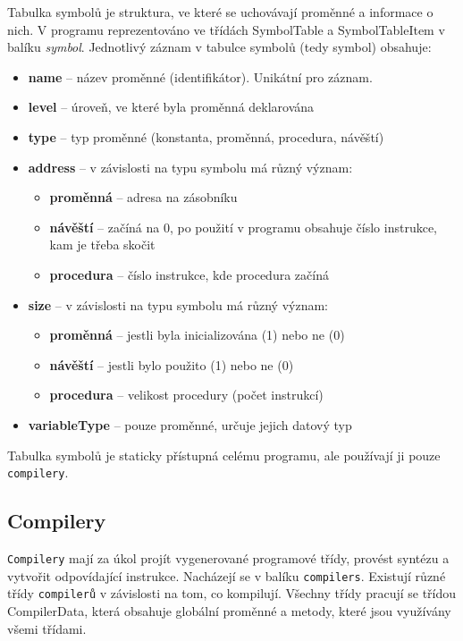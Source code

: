 \documentclass[
12pt,
a4paper,
pdftex,
czech,
titlepage
]{report}
\begin{document}
  Tabulka symbolů je struktura, ve které se uchovávají proměnné a informace o nich. V programu reprezentováno ve třídách SymbolTable a SymbolTableItem v balíku \textit{symbol}. Jednotlivý záznam v tabulce symbolů (tedy symbol) obsahuje:
\begin{itemize}
\item \textbf{name} -- název proměnné (identifikátor). Unikátní pro záznam.
\item \textbf{level} -- úroveň, ve které byla proměnná deklarována
\item \textbf{type} -- typ proměnné (konstanta, proměnná, procedura, návěští)
\item \textbf{address} -- v závislosti na typu symbolu má různý význam:
\begin{itemize}
\item \textbf{proměnná} -- adresa na zásobníku
\item \textbf{návěští} -- začíná na 0, po použití v programu obsahuje číslo instrukce, kam je třeba skočit
\item \textbf{procedura} -- číslo instrukce, kde procedura začíná
\end{itemize}
\item \textbf{size} -- v závislosti na typu symbolu má různý význam:
\begin{itemize}
\item \textbf{proměnná} -- jestli byla inicializována (1) nebo ne (0)
\item \textbf{návěští} -- jestli bylo použito (1) nebo ne (0)
\item \textbf{procedura} -- velikost procedury (počet instrukcí)
\end{itemize} 
\item \textbf{variableType} -- pouze proměnné, určuje jejich datový typ  
\end{itemize} 
  
Tabulka symbolů je staticky přístupná celému programu, ale používají ji pouze \texttt{compilery}.
  
\subsection{Compilery}
 
\texttt{Compilery} mají za úkol projít vygenerované programové třídy, provést syntézu a vytvořit odpovídající instrukce. Nacházejí se v balíku \texttt{compilers}. Existují různé třídy \texttt{compilerů} v závislosti na tom, co kompilují. Všechny třídy pracují se třídou CompilerData, která obsahuje globální proměnné a metody, které jsou využívány všemi třídami.
 
\end{document}
